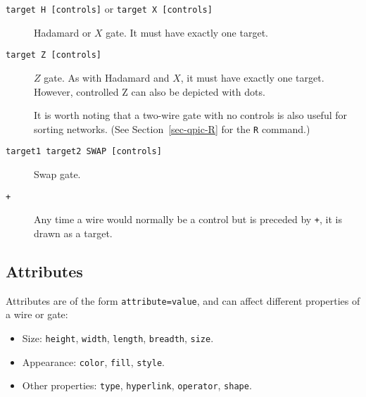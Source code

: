 \documentclass[twoside,12pt]{article}
\begin{document}
\begin{description}
\item[{\tt target H [controls]} or {\tt target X [controls]}] Hadamard or $X$ gate.
It must have exactly one target.

\begin{minipage}[b]{2in}

\end{minipage} \hfill 

\item[{\tt target Z [controls]}] $Z$ gate.  As with Hadamard and $X$, it must
  have exactly one target.  However, controlled Z can also be depicted with
  dots.

\begin{minipage}[b]{2in}

\end{minipage} \hfill 

It is worth noting that a two-wire gate with no controls is also useful for
sorting networks.  (See Section~\ref{sec-qpic-R} for the {\tt R} command.)

\begin{minipage}[b]{2in}

\end{minipage} \hfill 

\item[{\tt target1 target2 SWAP [controls]}] Swap gate.

\begin{minipage}[b]{2in}

\end{minipage} \hfill 

\item[{\tt +}] Any time a wire would normally be a control but is preceded
  by {\tt +}, it is drawn as a target.

\begin{minipage}[b]{2in}

\end{minipage} \hfill 

\end{description}

\subsection{Attributes}
\label{sec-qpic-style}

Attributes are of the form {\tt attribute=value}, and can affect different
properties of a wire or gate:
\begin{itemize}
\item Size: {\tt height}, {\tt width}, {\tt length}, {\tt breadth}, {\tt size}.
\item Appearance: {\tt color}, {\tt fill}, {\tt style}.
\item Other properties: {\tt type}, {\tt hyperlink}, {\tt operator}, {\tt shape}.
\end{itemize}
\end{document}

